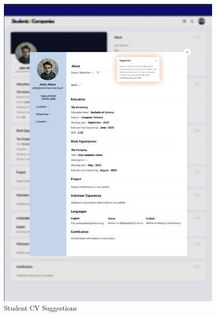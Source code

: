 \documentclass{article}
\begin{document}
\begin{figure}[H]
    \centering
    \includegraphics[scale = 0.65]{figures/UserInterfaces/Student/CVSuggestion.png}
    \caption{Student CV Suggestions}
     \centering
\end{figure}
\end{document}
